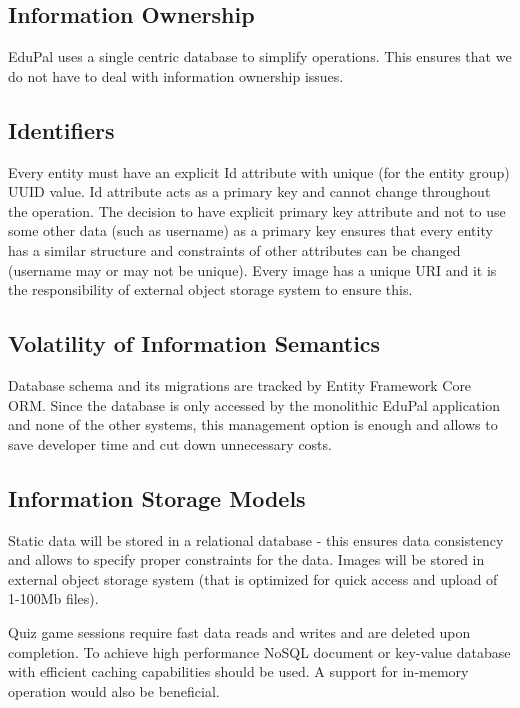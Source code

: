 \subsection{Information Ownership}

EduPal uses a single centric database to simplify operations. This ensures that we do not have to deal with information ownership issues.

\subsection{Identifiers}

Every entity must have an explicit Id attribute with unique (for the entity group) UUID value. Id attribute acts as a primary key and cannot change throughout the operation. The decision to have explicit primary key attribute and not to use some other data (such as username) as a primary key ensures that every entity has a similar structure and constraints of other attributes can be changed (username may or may not be unique). Every image has a unique URI and it is the responsibility of external object storage system to ensure this.

\subsection{Volatility of Information Semantics}

Database schema and its migrations are tracked by Entity Framework Core ORM. Since the database is only accessed by the monolithic EduPal application and none of the other systems, this management option is enough and allows to save developer time and cut down unnecessary costs.

\subsection{Information Storage Models}

Static data will be stored in a relational database - this ensures data consistency and allows to specify proper constraints for the data. Images will be stored in external object storage system (that is optimized for quick access and upload of 1-100Mb files).

Quiz game sessions require fast data reads and writes and are deleted upon completion. To achieve high performance NoSQL document or key-value database with efficient caching capabilities should be used. A support for in-memory operation would also be beneficial.

